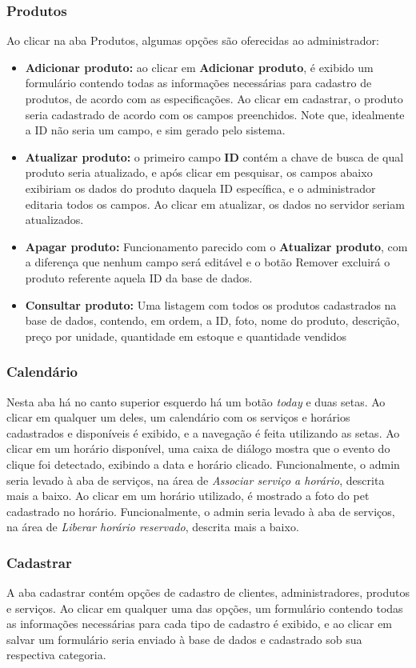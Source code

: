 \documentclass[10pt,a4paper]{article}
\begin{document}
\subsubsection{Produtos}
Ao clicar na aba Produtos, algumas opções são oferecidas ao administrador:
\begin{itemize}
\item \textbf{Adicionar produto:} ao clicar em \textbf{Adicionar produto}, é exibido um formulário contendo todas as informações necessárias para cadastro de produtos, de acordo com as especificações. Ao clicar em cadastrar, o produto seria cadastrado de acordo com os campos preenchidos. Note que, idealmente a ID não seria um campo, e sim gerado pelo sistema.
\item \textbf{Atualizar produto:} o primeiro campo \textbf{ID} contém a chave de busca de qual produto seria atualizado, e após clicar em pesquisar, os campos abaixo exibiriam os dados do produto daquela ID específica, e o administrador editaria todos os campos. Ao clicar em atualizar, os dados no servidor seriam atualizados.
\item \textbf{Apagar produto:} Funcionamento parecido com o \textbf{Atualizar produto}, com a diferença que nenhum campo será editável e o botão Remover excluirá o produto referente aquela ID da base de dados.
\item \textbf{Consultar produto:} Uma listagem com todos os produtos cadastrados na base de dados, contendo, em ordem, a ID, foto, nome do produto, descrição, preço por unidade, quantidade em estoque e quantidade vendidos
\end{itemize}
\subsubsection{Calendário}
Nesta aba há no canto superior esquerdo há um botão \textit{today} e duas setas. Ao clicar em qualquer um deles, um calendário com os serviços e horários cadastrados e disponíveis é exibido, e a navegação é feita utilizando as setas. Ao clicar em um horário disponível, uma caixa de diálogo mostra que o evento do clique foi detectado, exibindo a data e horário clicado. Funcionalmente, o admin seria levado à aba de serviços,  na área de \textit{Associar serviço a horário}, descrita mais a baixo. Ao clicar em um horário utilizado, é mostrado a foto do pet cadastrado no horário. Funcionalmente, o admin seria levado à aba de serviços,  na área de \textit{Liberar horário reservado}, descrita mais a baixo.
\subsubsection{Cadastrar}
A aba cadastrar contém opções de cadastro de clientes, administradores, produtos e serviços. Ao clicar em qualquer uma das opções, um formulário contendo todas as informações necessárias para cada tipo de cadastro é exibido, e ao clicar em salvar um formulário seria enviado à base de dados e cadastrado sob sua respectiva categoria.
\end{document}
